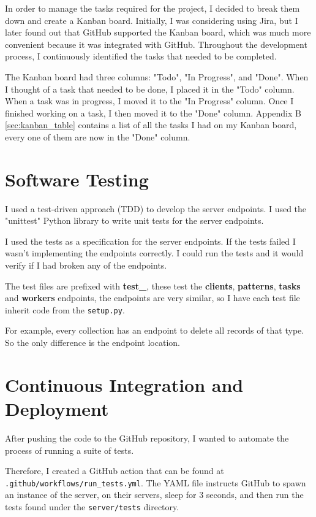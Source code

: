 In order to manage the tasks required for the project,
I decided to break them down and create a Kanban board.
Initially, I was considering using Jira, but I later found out that
GitHub supported the Kanban board,
which was much more convenient because it was integrated with GitHub.
Throughout the development process,
I continuously identified the tasks that needed to be completed.

The Kanban board had three columns: "Todo", "In Progress", and "Done".
When I thought of a task that needed to be done, I placed it in the "Todo" column.
When a task was in progress, I moved it to the "In Progress" column.
Once I finished working on a task, I then moved it to the "Done" column.
Appendix B \ref{sec:kanban_table} contains a list of
all the tasks I had on my Kanban board,
every one of them are now in the "Done" column.

\section{Software Testing}
I used a test-driven approach (TDD) to develop the server endpoints.
I used the "unittest" Python library to write unit tests for the server endpoints.

I used the tests as a specification for the server endpoints.
If the tests failed I wasn't implementing the endpoints correctly.
I could run the tests and it would verify if I had broken any of the endpoints.

The test files are prefixed with \textbf{test\_},
these test the \textbf{clients}, \textbf{patterns},
\textbf{tasks} and \textbf{workers} endpoints,
the endpoints are very similar, so I have each test file
inherit code from the \texttt{setup.py}.

For example, every collection has an endpoint to delete all records of that type.
So the only difference is the endpoint location.

\section{Continuous Integration and Deployment}
After pushing the code to the GitHub repository,
I wanted to automate the process of running a suite of tests.

Therefore, I created a GitHub action that can be found at \\
\texttt{.github/workflows/run\_tests.yml}.
The YAML file instructs GitHub to spawn an instance of the server, on their servers,
sleep for 3 seconds, and then run the tests found
under the \texttt{server/tests} directory.

